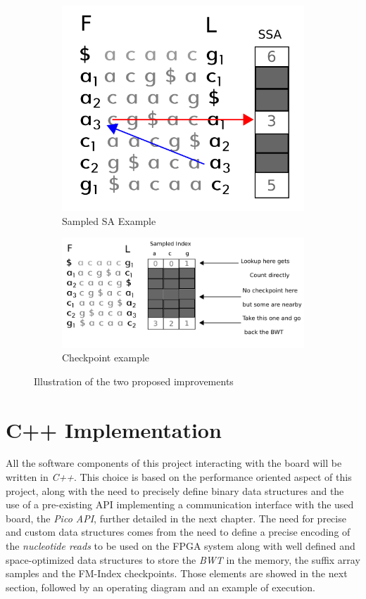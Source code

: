 		\begin{figure}[h]
			\centering
			\begin{subfigure}{.5\textwidth}
				\centering
	\hspace*{-10mm}\includegraphics[width=.5\linewidth]{Figures/SSA.png}
				\caption{Sampled SA Example}
				\label{fig:ssa}
				\end{subfigure}%
				\begin{subfigure}{.5\textwidth}
					\centering
					\includegraphics[width=\linewidth]{Figures/checkpoint.png}
					\caption{Checkpoint example}
					\label{fig:checkpoints}
					\end{subfigure}
					\caption{Illustration of the two proposed improvements}
					\label{fig:opti}
					\end{figure}


\section{C++ Implementation}

All the software components of this project interacting with the board will be written in \textsl{C++}. This choice is based on the performance oriented aspect of this project, along with the need to precisely define binary data structures and the use of a pre-existing API implementing a communication interface with the used board, the \textit{Pico API}, further detailed in the next chapter. The need for precise and custom data structures comes from the need to define a precise encoding of the \textsl{nucleotide reads} to be used on the FPGA system along with well defined and space-optimized data structures to store the \textsl{BWT} in the memory, the suffix array samples and the FM-Index checkpoints. Those elements are showed in the next section, followed by an operating diagram and an example of execution.

